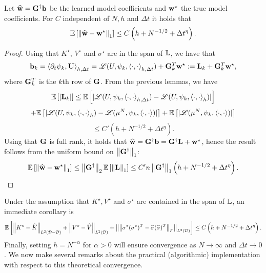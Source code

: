 \documentclass[english,reqno]{amsart}
\begin{document}

\begin{thm}\label{thm:w}
Let ${\widehat{\mathbf{w}}}=\mathbf{G}^\dagger\mathbf{b}$ be the learned model coefficients and $\mathbf{w}^\star$ the true model coefficients. For $C$ independent of $N,h$ and $\Delta t$ it holds that
\[\mathbb{E}\left[\left\Vert {{\widehat{\mathbf{w}}}-\mathbf{w}^\star} \right\Vert_1\right] \leq C\left(h+N^{-1/2}+\Delta t^\eta\right).\]
\end{thm}
\begin{proof}
Using that $K^\star$, $V^\star$ and $\sigma^\star$ are in the span of $\mathbb{L}$, we have that 
\[\mathbf{b}_k = \left\langle \partial_t\psi_k,\mathbf{U}\right\rangle_{h,\Delta t} = \mathscr{L}(U,\psi_k, \left\langle \cdot,\cdot \right\rangle_{h,\Delta t}) + \mathbf{G}^T_k \mathbf{w}^\star:=\mathbf{L}_k +\mathbf{G}^T_k\mathbf{w}^\star,\]
where $\mathbf{G}^T_k$ is the $k$th row of $\mathbf{G}$. From the previous lemmas, we have
\[\mathbb{E}\left[|\mathbf{L}_k|\right]\leq \mathbb{E}\left[|\mathscr{L}(U,\psi_k, \left\langle \cdot,\cdot\right\rangle_{h,\Delta t})-\mathscr{L}(U, \psi_k, \left\langle\cdot,\cdot\right\rangle_h)|\right]\]
\[+\mathbb{E}\left[|\mathscr{L}(U,\psi_k, \left\langle \cdot,\cdot\right\rangle_h)-\mathscr{L}(\mu^N, \psi_k, \left\langle\cdot,\cdot\right\rangle)|\right]+\mathbb{E}\left[|\mathscr{L}(\mu^N, \psi_k, \left\langle\cdot,\cdot\right\rangle)|\right]\]
\[\leq C'\left(h + N^{-1/2}+\Delta t^\eta\right).\]
Using that $\mathbf{G}$ is full rank, it holds that ${\widehat{\mathbf{w}}}=\mathbf{G}^\dagger\mathbf{b}=\mathbf{G}^\dagger\mathbf{L} +\mathbf{w}^\star$, hence the result follows from the uniform bound on $\left\Vert {\mathbf{G}^\dagger} \right\Vert_1$:
\[\mathbb{E}\left[\left\Vert {{\widehat{\mathbf{w}}}-\mathbf{w}^\star} \right\Vert_1\right]\leq \left\Vert {\mathbf{G}^\dagger} \right\Vert_2\mathbb{E}\left[\left\Vert {\mathbf{L}} \right\Vert_1\right]\leq C'n\left\Vert {\mathbf{G}^\dagger} \right\Vert_1\left(h + N^{-1/2}+\Delta t^\eta\right).\]
\end{proof}
Under the assumption that $K^\star, V^\star$ and $\sigma^\star$ are contained in the span of $\mathbb{L}$, an immediate corollary is 
\[\mathbb{E}\left[\left\Vert {K^\star- \widehat{K}} \right\Vert_{L^2({\mathcal{D}}-{\mathcal{D}})}+\left\Vert {V^\star - \widehat{V}} \right\Vert_{L^2({\mathcal{D}})}+\left\Vert {\left\Vert {\sigma^\star(\sigma^\star)^T-\widehat{\sigma}(\widehat{\sigma})^T} \right\Vert_F} \right\Vert_{L^2({\mathcal{D}})}\right]\leq C\left(h+N^{-1/2}+\Delta t^\eta\right).\]
Finally, setting $h = N^{-\alpha}$ for $\alpha>0$ will ensure convergence as $N\to\infty$ and $\Delta t\to 0$. We now make several remarks about the practical (algorithmic) implementation with respect to this theoretical convergence.
\end{document}
